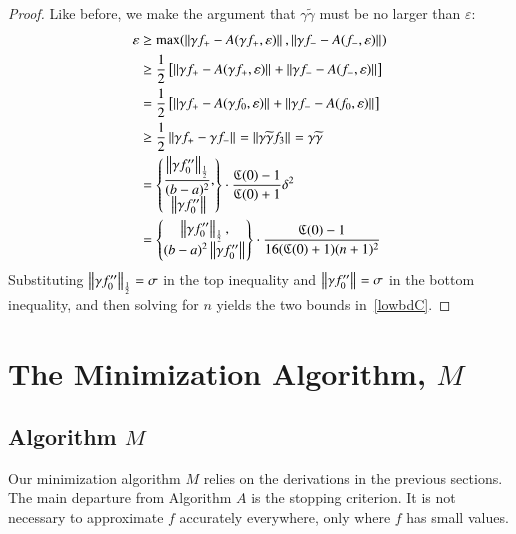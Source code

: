 \documentclass[review]{elsarticle}
\newcommand{\abstol}{\varepsilon}
\theoremstyle{definition}
\newcommand{\tgamma}{\widetilde{\gamma}}
\begin{document}
\begin{proof}
Like before, we make the argument that $\gamma\tgamma$ must be no larger than $\abstol$:
\begin{align*}
\abstol & \ge \max(\norm{\gamma f_+-A(\gamma f_+,\abstol)},\norm{\gamma f_--A(f_-, \abstol)}) \\
& \ge \frac{1}{2} \left[ \norm{\gamma f_+-A(\gamma f_+,\abstol)}+ \norm{\gamma f_--A(f_-, \abstol)} \right] \\
& = \frac{1}{2} \left[ \norm{\gamma f_+-A(\gamma f_0,\abstol)}+ \norm{\gamma f_--A(f_0, \abstol)} \right] \\
& \ge \frac{1}{2}  \norm{\gamma f_+ - \gamma f_-} =  \norm{\gamma \tgamma f_3} = \gamma \tgamma\\
& = \begin{Bmatrix} \displaystyle
\frac{\norm[\frac 12]{\gamma f_0''}}{(b-a)^2}, \\
\norm{\gamma f_0''}
\end{Bmatrix}  \cdot \frac{\fC(0)-1}{\fC(0)+1} \delta^2\\
& = \begin{Bmatrix} \displaystyle
\norm[\frac 12]{\gamma f_0''}, \\
(b-a)^2\norm{\gamma f_0''}
\end{Bmatrix}  \cdot \frac{\fC(0)-1}{16(\fC(0)+1)(n+1)^2}
\end{align*}
Substituting $\norm[\frac12]{\gamma f_0''} = \sigma$ in the top inequality and $\norm{\gamma f_0''} = \sigma$ in the bottom inequality, and then solving for $n$ yields the two bounds in~\eqref{lowbdC}.
\end{proof}



\section{The Minimization Algorithm, $M$} \label{sec:funmin}

\subsection{Algorithm $M$}  \label{sec:minalgo}
Our minimization algorithm $M$ relies on the derivations in the previous sections.  The main departure from Algorithm $A$ is the stopping criterion.  It is not necessary to approximate $f$ accurately everywhere, only where $f$ has small values.
\end{document}
